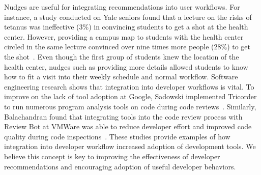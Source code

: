 Nudges are useful for integrating recommendations into user workflows. For instance, a study conducted on Yale seniors found that a lecture on the risks of tetanus was ineffective (3\%) in convincing students to get a shot at the health center. However, providing a campus map to students with the health center circled in the same lecture convinced over nine times more people (28\%) to get the shot~\cite{leventhal1965specificity}. Even though the first group of students knew the location of the health center, nudges such as providing more details allowed students to know how to fit a visit into their weekly schedule and normal workflow. Software engineering research shows that integration into developer workflows is vital. To improve on the lack of tool adoption at Google, Sadowski implemented Tricorder to run numerous program analysis tools on code during code reviews~\cite{Tricorder}. Similarly, Balachandran found that integrating tools into the code review process with Review Bot at VMWare was able to reduce developer effort and improved code quality during code inspections~\cite{balachandran2013reducing}. These studies provide examples of how integration into developer workflow increased adoption of development tools. We believe this concept is key to improving the effectiveness of developer recommendations and encouraging adoption of useful developer behaviors.










